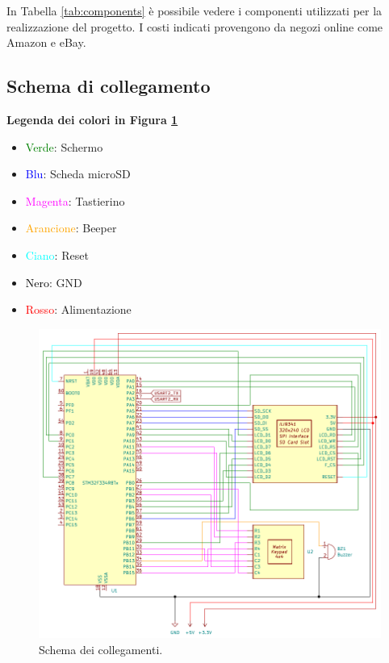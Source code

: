 \documentclass[a4paper]{article}
\begin{document}
In Tabella \ref{tab:components} è possibile vedere i componenti utilizzati per la
realizzazione del progetto. I costi indicati provengono da negozi online come Amazon e eBay.

\subsection{Schema di collegamento} \label{subsubsec:collegamenti}

\textbf{Legenda dei colori in Figura \ref{fig:schema}}

\begin{multicols}{2}
\begin{itemize}
    \item \textcolor{green}{Verde}: Schermo
    \item \textcolor{blue}{Blu}: Scheda microSD
    \item \textcolor{magenta}{Magenta}: Tastierino
    \item \textcolor{orange}{Arancione}: Beeper
    \item \textcolor{cyan}{Ciano}: Reset
    \item \textcolor{black}{Nero}: GND
    \item \textcolor{red}{Rosso}: Alimentazione
\end{itemize}
\end{multicols}

\clearpage

\begin{figure}[h!t]
    \begin{center}
        \includegraphics[scale=1]{figures/STM32_CHIP8.pdf}
    \end{center}
    \caption{
        Schema dei collegamenti.
    }
    \label{fig:schema}
\end{figure}
\end{document}
